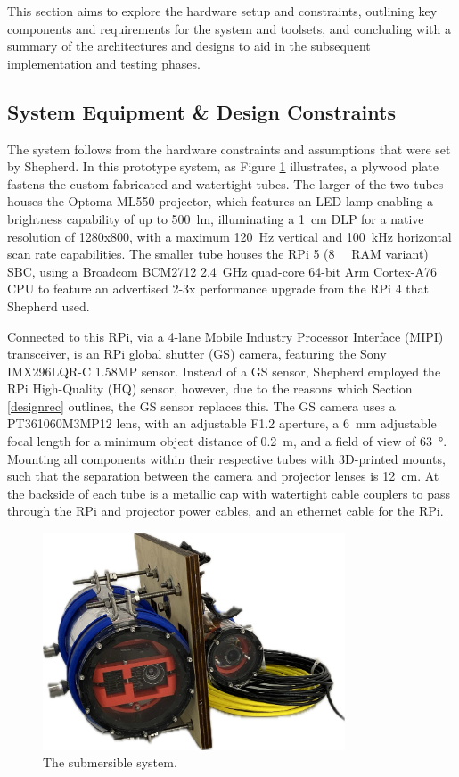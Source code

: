 This section aims to explore the hardware setup and constraints, outlining key components and requirements for the system and toolsets, and concluding with a summary of the architectures and designs to aid in the subsequent implementation and testing phases.

\subsection{System Equipment \& Design Constraints}
\label{designconstraints}

The system follows from the hardware constraints and assumptions that were set by Shepherd. In this prototype system, as Figure \ref{fig:submersible} illustrates, a plywood plate fastens the custom-fabricated and watertight tubes. The larger of the two tubes houses the Optoma ML550 projector, which features an LED lamp enabling a brightness capability of up to \SI{500}{\lumen}, illuminating a \SI{1}{\centi\metre} DLP for a native resolution of 1280x800, with a maximum \SI{120}{\hertz} vertical and \SI{100}{\kilo\hertz} horizontal scan rate capabilities. The smaller tube houses the RPi 5 (\SI{8}{\giga\byte} RAM variant) SBC, using a Broadcom BCM2712 \SI{2.4}{\giga\hertz} quad-core 64-bit Arm Cortex-A76 CPU to feature an advertised 2-3x performance upgrade from the RPi 4 that Shepherd used.

Connected to this RPi, via a 4-lane Mobile Industry Processor Interface (MIPI) transceiver, is an RPi global shutter (GS) camera, featuring the Sony IMX296LQR-C 1.58MP sensor. Instead of a GS sensor, Shepherd employed the RPi High-Quality (HQ) sensor, however, due to the reasons which Section \ref{designrec} outlines, the GS sensor replaces this. The GS camera uses a PT361060M3MP12 lens, with an adjustable F1.2 aperture, a \SI{6}{\milli\metre} adjustable focal length for a minimum object distance of \SI{0.2}{\metre}, and a field of view of \SI{63}{\degree}. Mounting all components within their respective tubes with 3D-printed mounts, such that the separation between the camera and projector lenses is \SI{12}{\centi\metre}. At the backside of each tube is a metallic cap with watertight cable couplers to pass through the RPi and projector power cables, and an ethernet cable for the RPi.

\begin{figure}[H]
    \centering
    \includegraphics[width=0.8\textwidth]{assets/submersible.png}
    \caption{The submersible system.}
    \label{fig:submersible}
\end{figure}

